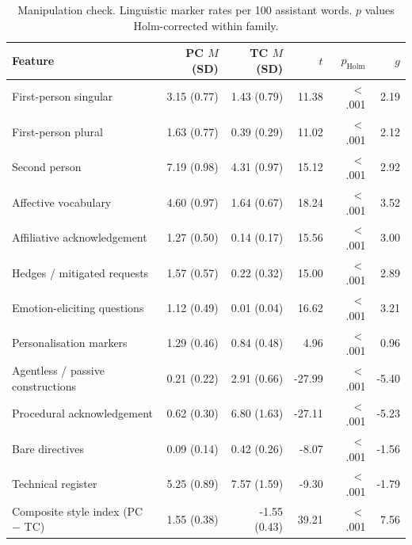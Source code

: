 \begin{table}[t]
\centering
\small
\begin{tabular}{lrrrrr}
\toprule
Feature & PC $M$ (SD) & TC $M$ (SD) & $t$ & $p_{\text{Holm}}$ & $g$ \\
\midrule
First-person singular & 3.15 (0.77) & 1.43 (0.79) & 11.38 & $<$.001 & 2.19 \\
First-person plural & 1.63 (0.77) & 0.39 (0.29) & 11.02 & $<$.001 & 2.12 \\
Second person & 7.19 (0.98) & 4.31 (0.97) & 15.12 & $<$.001 & 2.92 \\
Affective vocabulary & 4.60 (0.97) & 1.64 (0.67) & 18.24 & $<$.001 & 3.52 \\
Affiliative acknowledgement & 1.27 (0.50) & 0.14 (0.17) & 15.56 & $<$.001 & 3.00 \\
Hedges / mitigated requests & 1.57 (0.57) & 0.22 (0.32) & 15.00 & $<$.001 & 2.89 \\
Emotion-eliciting questions & 1.12 (0.49) & 0.01 (0.04) & 16.62 & $<$.001 & 3.21 \\
Personalisation markers & 1.29 (0.46) & 0.84 (0.48) & 4.96 & $<$.001 & 0.96 \\
Agentless / passive constructions & 0.21 (0.22) & 2.91 (0.66) & -27.99 & $<$.001 & -5.40 \\
Procedural acknowledgement & 0.62 (0.30) & 6.80 (1.63) & -27.11 & $<$.001 & -5.23 \\
Bare directives & 0.09 (0.14) & 0.42 (0.26) & -8.07 & $<$.001 & -1.56 \\
Technical register & 5.25 (0.89) & 7.57 (1.59) & -9.30 & $<$.001 & -1.79 \\
Composite style index (PC $-$ TC) & 1.55 (0.38) & -1.55 (0.43) & 39.21 & $<$.001 & 7.56 \\
\bottomrule
\end{tabular}
\caption{Manipulation check. Linguistic marker rates per 100 assistant words. $p$ values Holm-corrected within family.}
\label{tab:manipcheck}
\end{table}